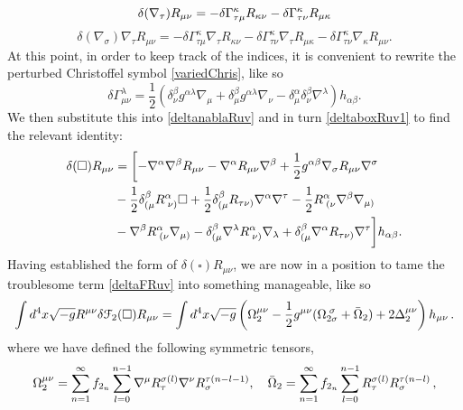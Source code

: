 \begin{equation}
\delta(\nabla_{\tau})R_{\mu\nu}=-\delta\Gamma_{\tau\mu}^{\kappa}R_{\kappa\nu}-\delta\Gamma_{\tau\nu}^{\kappa}R_{\mu\kappa}
 \nonumber 
\end{equation}
\begin{equation}
\label{deltanablaRuv}
\delta(\nabla_{\sigma})\nabla_{\tau}R_{\mu\nu}=-\delta\Gamma_{\tau\mu}^{\kappa}\nabla_{\tau}R_{\kappa\nu}-\delta\Gamma_{\tau\nu}^{\kappa}\nabla_{\tau}R_{\mu\kappa}-\delta\Gamma_{\tau\nu}^{\kappa}\nabla_{\kappa}R_{\mu\nu}.
\end{equation}
At this point, in order to keep track of the indices, it is convenient to rewrite the perturbed Christoffel symbol \eqref{variedChris}, like so
\begin{equation}
\label{Christoffelhab}
\delta\Gamma_{\mu\nu}^{\lambda}=\frac{1}{2}\left(\delta_{\nu}^{\beta}g^{\alpha\lambda}\nabla_{\mu}+\delta_{\mu}^{\beta}g^{\alpha\lambda}\nabla_{\nu}-\delta_{\mu}^{\alpha}\delta_{\nu}^{\beta}\nabla^{\lambda}\right)h_{\alpha\beta}.
 \end{equation}
 We then substitute this into \eqref{deltanablaRuv} and in turn \eqref{deltaboxRuv1} to find the relevant identity:
 \begin{align}
 \label{deltaBoxSuv}
 \delta(\square)R_{\mu\nu}	&=	\biggl[-\nabla^{\alpha}\nabla^{\beta}R_{\mu\nu}-\nabla^{\alpha}R_{\mu\nu}\nabla^{\beta}+\frac{1}{2}g^{\alpha\beta}\nabla_{\sigma}R_{\mu\nu}\nabla^{\sigma}
		\nonumber\\&
		-\frac{1}{2}\delta_{(\mu}^{\beta}R_{\;\nu)}^{\alpha}\Box+\frac{1}{2}\delta_{(\mu}^{\beta}R_{\tau\nu)}\nabla^{\alpha}\nabla^{\tau}-\frac{1}{2}R_{\;(\nu}^{\alpha}\nabla^{\beta}\nabla_{\mu)}
		\nonumber\\&
		-\nabla^{\beta}R_{\;(\nu}^{\alpha}\nabla_{\mu)}-\delta_{(\mu}^{\beta}\nabla^{\lambda}R_{\;\nu)}^{\alpha}\nabla_{\lambda}+\delta_{(\mu}^{\beta}\nabla^{\alpha}R_{\tau\nu)}\nabla^{\tau}\biggr]h_{\alpha\beta}.
 \end{align}
Having established the form of $\delta(\square)R_{\mu\nu}$, we are now in a position to tame the troublesome term \eqref{deltaFRuv} into something manageable, like so
\begin{equation}
\int d^{4}x\sqrt{-g}R^{\mu\nu}\delta{\cal F}_{2}(\Box)R_{\mu\nu}=\int d^{4}x\sqrt{-g}\left(\Omega_{2}^{\mu\nu}-\frac{1}{2}g^{\mu\nu}(\Omega_{2\sigma}^{\;\sigma}+\bar{\Omega}_{2})+2\Delta_{2}^{\mu\nu}\right)h_{\mu\nu}\,.
 \end{equation}
where we have defined the following symmetric tensors,
\begin{equation}
\nonumber
\Omega_{2}^{\mu\nu}=\sum_{n=1}^{\infty}f_{2_{n}}\sum_{l=0}^{n-1}\nabla^{\mu}R_{\tau}^{\sigma(l)}\nabla^{\nu}R_{\sigma}^{\tau(n-l-1)},\quad\bar{\Omega}_{2}=\sum_{n=1}^{\infty}f_{2_{n}}\sum_{l=0}^{n-1}R_{\tau}^{\sigma(l)}R_{\sigma}^{\tau(n-l)}\,,
\end{equation}
